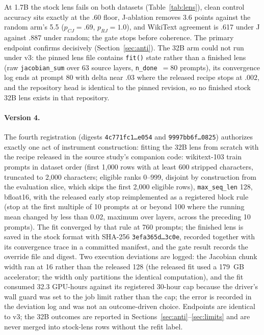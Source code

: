 \documentclass{article}
\begin{document}
At 1.7B the stock lens fails on both datasets (Table~\ref{tab:lens}), clean control
accuracy sits exactly at the .60 floor, J-ablation removes 3.6 points against the random
arm's 5.5 ($p_{CJ}=.69$, $p_{RJ}=1.0$), and WikiText agreement is .617 under J against
.887 under random; the gate stops before coherence. The primary endpoint confirms
decisively (Section~\ref{sec:anti}). The 32B arm could not run under v3: the pinned lens
file contains \texttt{fit()} state rather than a finished lens (raw
\texttt{jacobian\_sum} over 63 source layers, \texttt{n\_done}~$=80$ prompts), its convergence log ends
at prompt 80 with delta near $.03$ where the released recipe stops at $.002$, and the
repository head is identical to the pinned revision, so no finished stock 32B lens exists
in that repository.

\paragraph{Version 4.}
The fourth registration (digests \texttt{4c771fc1\ldots{}e054} and
\texttt{9997bb6f\ldots{}0825}) authorizes exactly one act of instrument construction:
fitting the 32B lens from scratch with the recipe released in the source study's
companion code: wikitext-103 train prompts in dataset order (first 1{,}000 rows with at least 600
stripped characters, truncated to 2{,}000 characters; eligible ranks 0--999, disjoint by
construction from the evaluation slice, which skips the first 2{,}000 eligible rows),
\texttt{max\_seq\_len} 128, bfloat16, with the released early stop reimplemented as a
registered block rule (stop at the first multiple of 10 prompts at or beyond 100 where
the running mean changed by less than 0.02, maximum over layers, across the preceding 10
prompts). The fit converged by that rule at 760 prompts; the finished lens is saved in
the stock format with SHA-256 \texttt{3efa365d\ldots{}3c0e}, recorded together with its
convergence trace in a committed manifest, and the gate result records the override file
and digest. Two execution deviations are logged: the Jacobian chunk width ran at 16
rather than the released 128 (the released fit used a 179~GB accelerator; the width only
partitions the identical computation), and the fit consumed 32.3 GPU-hours against its
registered 30-hour cap because the driver's wall guard was set to the job limit rather
than the cap; the error is recorded in the deviation log and was not an outcome-driven
choice. Endpoints are identical to v3; the 32B outcomes are reported in
Sections~\ref{sec:anti}--\ref{sec:limits} and are never merged into stock-lens rows
without the refit label.
\end{document}

